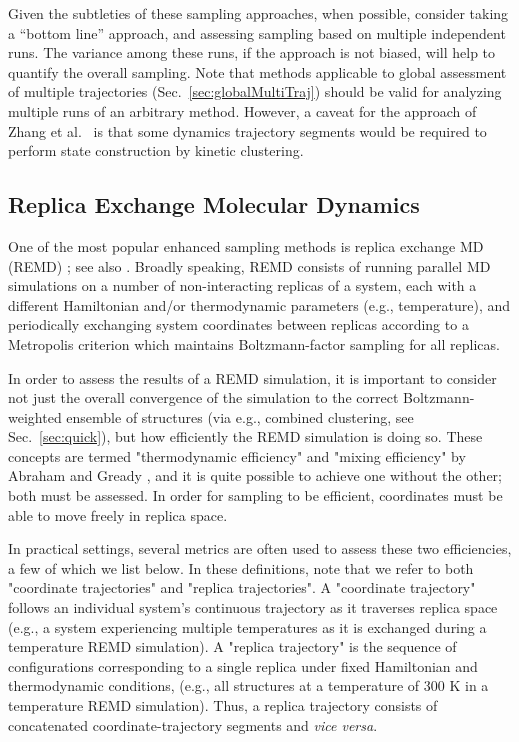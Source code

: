 Given the subtleties of these sampling approaches, when possible, consider taking a ``bottom line'' approach, and assessing sampling based on multiple independent runs.
The variance among these runs, if the approach is not biased, will help to quantify the overall sampling.
Note that methods applicable to global assessment of multiple trajectories (Sec.\ \ref{sec:globalMultiTraj}) should be valid for analyzing multiple runs of an arbitrary method.
However, a caveat for the approach of Zhang et al.\ \cite{Zhang2010} is that some dynamics trajectory segments would be required to perform state construction by kinetic clustering.

\subsection{Replica Exchange Molecular Dynamics}
One of the most popular enhanced sampling methods is replica exchange MD (REMD) \citep{Sugita1999}; see also \cite{Swendsen-1986}. Broadly speaking, REMD consists of running parallel MD simulations on a number of non-interacting replicas of a system, each with a different Hamiltonian and/or thermodynamic parameters (e.g., temperature), and periodically exchanging system coordinates between replicas according to a Metropolis criterion which maintains Boltzmann-factor sampling for all replicas.



In order to assess the results of a REMD simulation, it is important to consider not just the overall convergence of the simulation to the correct Boltzmann-weighted ensemble of structures (via e.g., combined clustering, see Sec.~\ref{sec:quick}), but how efficiently the REMD simulation is doing so. These concepts are termed "thermodynamic efficiency" and "mixing efficiency" by Abraham and Gready \citep{Abraham2008}, and it is quite possible to achieve one without the other; both must be assessed. In order for sampling to be efficient, coordinates must be able to move freely in replica space.

In practical settings, several metrics are often used to assess these two efficiencies, a few of which we list below.  In these definitions, note that we refer to both "coordinate trajectories" and "replica trajectories". A "coordinate trajectory" follows an individual system's continuous trajectory as it traverses replica space (e.g., a system experiencing multiple temperatures as it is exchanged during a temperature REMD simulation). A "replica trajectory" is the sequence of configurations corresponding to a single replica under fixed Hamiltonian and thermodynamic conditions, (e.g., all structures at a temperature of 300 K in a temperature REMD simulation).  Thus, a replica trajectory consists of concatenated coordinate-trajectory segments and \textit{vice versa}.

